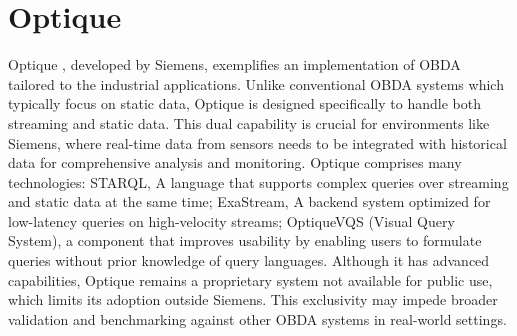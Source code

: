 \section{Optique}
Optique \cite{DBLP:journals/ws/KharlamovMSXKR19}, developed by Siemens, exemplifies an implementation of OBDA tailored to the industrial applications. Unlike conventional OBDA systems which typically focus on static data, Optique is designed specifically to handle both streaming and static data. This dual capability is crucial for environments like Siemens, where real-time data from sensors needs to be integrated with historical data for comprehensive analysis and monitoring.
Optique comprises many technologies: \ac{STARQL}, A language that supports complex queries over streaming and static data at the same time; ExaStream, A backend system optimized for low-latency queries on high-velocity streams; OptiqueVQS (Visual Query System), a component that improves usability by enabling users to formulate queries without prior knowledge of query languages.
Although it has advanced capabilities, Optique remains a proprietary system not available for public use, which limits its adoption outside Siemens. This exclusivity may impede broader validation and benchmarking against other OBDA systems in real-world settings.